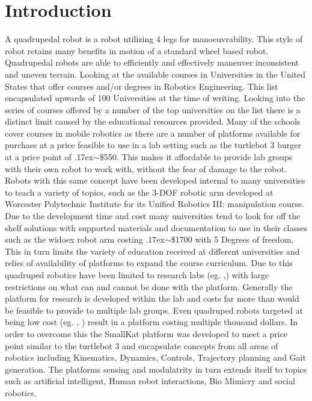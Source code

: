 \documentclass[12pt]{report}
\newcommand{\approximately}{{\raise.17ex\hbox{$\scriptstyle\mathtt{\sim}$}}}
\begin{document}
\chapter{Introduction}
A quadrupedal robot is a robot utilizing 4 legs for manoeuvrability. This style of robot retains many benefits in motion of a standard wheel based robot. Quadrupedal robots are able to efficiently and effectively maneuver inconsistent and uneven terrain.
Looking at the available courses in Universities in the United States that offer courses and/or degrees in Robotics Engineering. This list encapsulated upwards of 100 Universities at the time of writing. Looking into the series of courses offered by a number of the top universities on the list there is a distinct limit caused by the educational resources provided. Many of the schools cover courses in mobile robotics as there are a number of platforms available for purchase at a price feasible to use in a lab setting such as the turtlebot 3 burger at a price point of \approximately\$550. This makes it affordable to provide lab groups with their own robot to work with, without the fear of damage to the robot. Robots with this same concept have been developed internal to many universities to teach a variety of topics, such as the 3-DOF robotic arm developed at Worcester Polytechnic Institute for its Unified Robotics III: manipulation course. Due to the development time and cost many universities tend to look for off the shelf solutions with supported materials and documentation to use in their classes such as the widoex robot arm costing \approximately\$1700 with 5 Degrees of freedom. This in turn limits the variety of education received at different universities and relies of availability of platforms to expand the course curriculum. Due to this quadruped robotics have been limited to research labs (eg. \cite{8593885},\cite{HyQ}) with large restrictions on what can and cannot be done with the platform. Generally the platform for research is developed within the lab and costs far more than would be feasible to provide to multiple lab groups. Even quadruped robots targeted at being low cost (eg. \cite{8793865},  \cite{Geva2014AND}) result in a platform costing multiple thousand dollars.  In order to overcome this the SmallKat platform was developed to meet a price point similar to the turtlebot 3 and encapsulate concepts from all areas of robotics including Kinematics, Dynamics, Controls, Trajectory planning and Gait generation. The platforms sensing and modulatrity in turn extends itself to topics such as artificial intelligent, Human robot interactions, Bio Mimicry and social robotics. 
\end{document}
